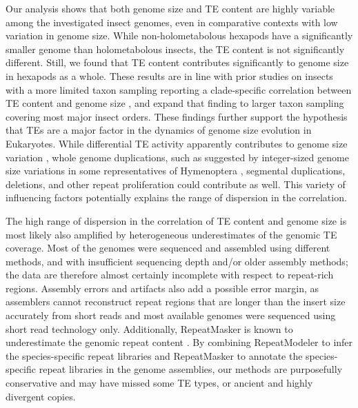 Our analysis shows that both genome size and TE content are highly
variable among the investigated insect genomes, even in comparative
contexts with low variation in genome size. While non-holometabolous
hexapods have a significantly smaller genome than holometabolous
insects, the TE content is not significantly different. Still, we found
that TE content contributes significantly to genome size in hexapods as
a whole. These results are in line with prior studies on insects with a
more limited taxon sampling reporting a clade-specific correlation
between TE content and genome size \citep{Vieira1999,Vieira2002,Kidwell2000,Honeybee2006,Bosco2007,Sessegolo2016}, and expand that
finding to larger taxon sampling covering most major insect orders.
These findings further support the hypothesis that TEs are a major
factor in the dynamics of genome size evolution in Eukaryotes. While
differential TE activity apparently contributes to genome size variation
\citep{Petrov2001,Kidwell2002,Agren2011}, whole genome duplications, such as suggested by
integer-sized genome size variations in some representatives of
Hymenoptera \citep{Li2018}, segmental duplications, deletions, and
other repeat proliferation \citep{Parfrey2008} could contribute as well.
This variety of influencing factors potentially explains the range of
dispersion in the correlation.

The high range of dispersion in the correlation of TE content and genome
size is most likely also amplified by heterogeneous underestimates of
the genomic TE coverage. Most of the genomes were sequenced and
assembled using different methods, and with insufficient sequencing
depth and/or older assembly methods; the data are therefore almost
certainly incomplete with respect to repeat-rich regions. Assembly
errors and artifacts also add a possible error margin, as assemblers
cannot reconstruct repeat regions that are longer than the insert size
accurately from short reads \citep{Schatz2010,Sambaturu2014,Chaisson2015,Peona2018} and most available
genomes were sequenced using short read technology only. Additionally,
RepeatMasker is known to underestimate the genomic repeat content
\citep{deKoning2011}. By combining RepeatModeler to infer the
species-specific repeat libraries and RepeatMasker to annotate the
species-specific repeat libraries in the genome assemblies, our methods
are purposefully conservative and may have missed some TE types, or
ancient and highly divergent copies.

